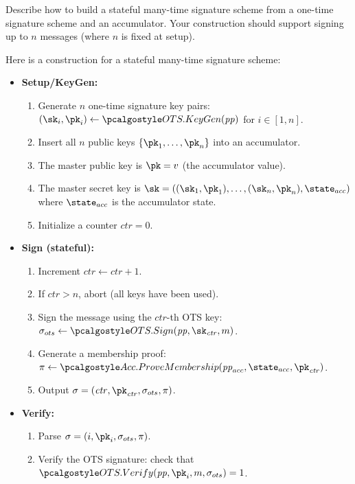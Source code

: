 \begin{exercise}[Optional]
  Describe how to build a stateful many-time signature scheme from a one-time signature scheme and an accumulator.
  Your construction should support signing up to $n$ messages (where $n$ is fixed at setup).
\end{exercise}

\ifsolutions
\begin{mysolution}
  Here is a construction for a stateful many-time signature scheme:
  \begin{itemize}
    \item \textbf{Setup/KeyGen:} 
      \begin{enumerate}
        \item Generate $n$ one-time signature key pairs: $(\sk_i, \pk_i) \gets \algo{OTS.KeyGen}(\params)$ for $i \in [1,n]$.
        \item Insert all $n$ public keys $\{\pk_1, \ldots, \pk_n\}$ into an accumulator.
        \item The master public key is $\pk = v$ (the accumulator value).
        \item The master secret key is $\sk = ((\sk_1, \pk_1), \ldots, (\sk_n, \pk_n), \state_{acc})$ where $\state_{acc}$ is the accumulator state.
        \item Initialize a counter $\mathit{ctr} = 0$.
      \end{enumerate}
    \item \textbf{Sign (stateful):}
      \begin{enumerate}
        \item Increment $\mathit{ctr} \gets \mathit{ctr} + 1$.
        \item If $\mathit{ctr} > n$, abort (all keys have been used).
        \item Sign the message using the $\mathit{ctr}$-th OTS key: $\sigma_{ots} \gets \algo{OTS.Sign}(\params, \sk_{\mathit{ctr}}, m)$.
        \item Generate a membership proof: $\pi \gets \algo{Acc.ProveMembership}(\params_{acc}, \state_{acc}, \pk_{\mathit{ctr}})$.
        \item Output $\sigma = (\mathit{ctr}, \pk_{\mathit{ctr}}, \sigma_{ots}, \pi)$.
      \end{enumerate}
    \item \textbf{Verify:}
      \begin{enumerate}
        \item Parse $\sigma = (i, \pk_i, \sigma_{ots}, \pi)$.
        \item Verify the OTS signature: check that $\algo{OTS.Verify}(\params, \pk_i, m, \sigma_{ots}) = 1$.

\end{enumerate}
\end{itemize}
\end{mysolution}

